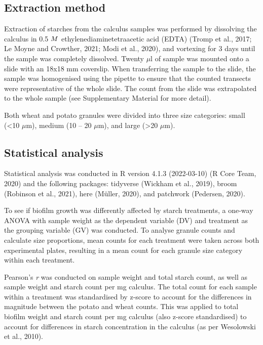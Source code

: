 \documentclass[utf8]{frontiers/frontiersSCNS}
\begin{document}
\hypertarget{extraction-method}{%
\subsection{Extraction method}\label{extraction-method}}

Extraction of starches from the calculus samples was performed by dissolving the
calculus in 0.5 \(\tiny{M}\) ethylenediaminetetraacetic acid (EDTA)
(Tromp et al., 2017; Le Moyne and Crowther, 2021; Modi et al., 2020),
and vortexing for 3 days until the sample was completely dissolved.
Twenty \(\mu\)l of sample was mounted onto a slide with an 18x18 mm coverslip.
When transferring the sample to the slide, the sample was homogenised using
the pipette to ensure that the counted transects were representative of the
whole slide. The count from the slide was extrapolated to the whole sample
(see Supplementary Material for more detail).

Both wheat and potato granules were divided into three size categories:
small (\textless10 \(\mu\)m), medium (10 -- 20 \(\mu\)m), and large (\textgreater20 \(\mu\)m).

\hypertarget{statistical-analysis}{%
\subsection{Statistical analysis}\label{statistical-analysis}}

Statistical analysis was conducted in R version 4.1.3 (2022-03-10) (R Core Team, 2020) and
the following packages: tidyverse (Wickham et al., 2019), broom (Robinson et al., 2021),
here (Müller, 2020), and patchwork (Pedersen, 2020).

To see if biofilm growth was differently affected by starch treatments, a
one-way ANOVA with sample weight as the dependent variable (DV) and treatment
as the grouping variable (GV) was conducted.
To analyse granule counts and calculate size proportions, mean counts for each
treatment were taken across
both experimental plates, resulting in a mean count for each
granule size category within each treatment.

Pearson's \emph{r} was conducted on sample weight and total starch count, as well as sample
weight and starch count per mg calculus. The total count for each sample within a
treatment was standardised by z-score to account for the differences in magnitude
between the potato and wheat counts.
This was applied to total biofilm weight and starch count per mg
calculus (also z-score standardised) to account for differences in starch
concentration in the calculus (as per Wesolowski et al., 2010).
\end{document}
